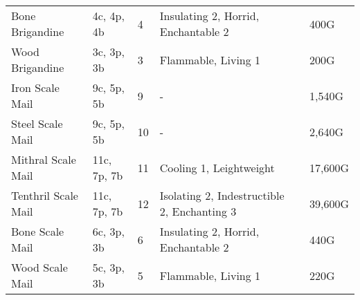 \begin{longtable}{p{3.5cm} | p{1.5cm} | p{0.75cm} | p{4cm} | p{1cm} | p{1.25cm}}
	Bone Brigandine & 4c, 4p, 4b & 4 & Insulating 2, Horrid, Enchantable 2 &  & 400G\\
	
	Wood Brigandine & 3c, 3p, 3b & 3 & Flammable, Living 1 &  & 200G\\
	
	Iron Scale Mail & 9c, 5p, 5b & 9 & - &  & 1,540G\\
	
	Steel Scale Mail & 9c, 5p, 5b & 10 & - &  & 2,640G\\
	
	Mithral Scale Mail & 11c, 7p, 7b & 11 & Cooling 1, Leightweight &  & 17,600G\\
	
	Tenthril Scale Mail & 11c, 7p, 7b & 12 & Isolating 2, Indestructible 2, Enchanting 3 &  & 39,600G\\
	
	Bone Scale Mail & 6c, 3p, 3b & 6 & Insulating 2, Horrid, Enchantable 2 &  & 440G\\
	
	Wood Scale Mail & 5c, 3p, 3b & 5 & Flammable, Living 1 &  & 220G\\
	
\end{longtable}